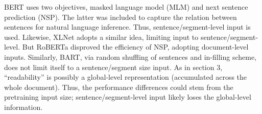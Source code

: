 \documentclass[11pt]{article}
\begin{document}
BERT uses two objectives, masked language model (MLM) and next sentence prediction (NSP). The latter was included to capture the relation between sentences for natural language inference. Thus, sentence/segment-level input is used. Likewise, XLNet adopts a similar idea, limiting input to sentence/segment-level. But RoBERTa disproved the efficiency of NSP, adopting document-level inputs. Similarly, BART, via random shuffling of sentences and in-filling scheme, does not limit itself to a sentence/segment size input. As in section 3, ``readability'' is possibly a global-level representation (accumulated across the whole document). Thus, the performance differences could stem from the pretraining input size; sentence/segment-level input likely loses the global-level information.
\begin{table}[h]
    \centering
\end{table}
\end{document}
